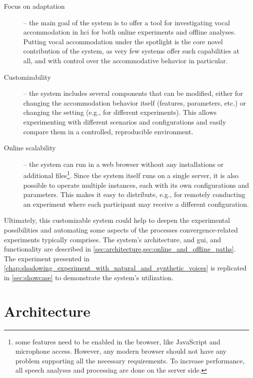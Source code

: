 \begin{description}
	\item[Focus on adaptation] --
	the main goal of the system is to offer a tool for investigating vocal accommodation in \ac{hci} for both online experiments and offline analyses.
	Putting vocal accommodation under the spotlight is the core novel contribution of the system, as very few systems offer such capabilities at all, and with control over the accommodative behavior in particular.
	
	\item[Customizability] --
	the system includes several components that can be modified, either for changing the accommodation behavior itself (features, parameters, etc.) or changing the setting (e.g., for different experiments).
	This allows experimenting with different scenarios and configurations and easily compare them in a controlled, reproducible environment.
	
	\item[Online scalability] --
	the system can run in a web browser without any installations or additional files\footnote{some features need to be enabled in the browser, like JavaScript and microphone access.
	However, any modern browser should not have any problem supporting all the necessary requirements.
	To increase performance, all speech analyses and processing are done on the server side.}.
	Since the system itself runs on a single server, it is also possible to operate multiple instances, each with its own configurations and parameters.
	This makes it easy to distribute, e.g., for remotely conducting an experiment where each participant may receive a different configuration.
\end{description}
%
Ultimately, this customizable system could help to deepen the experimental possibilities and automating some aspects of the processes convergence-related experiments typically comprises.
The system's architecture, and \ac{gui}, and functionality are described in \cref{sec:architecture,sec:online_and_offline_paths}.
The experiment presented in \cref{chap:shadowing_experiment_with_natural_and_synthetic_voices} is replicated in \cref{sec:showcase} to demonstrate the system's utilization.

\section{Architecture}
\label{sec:architecture}

